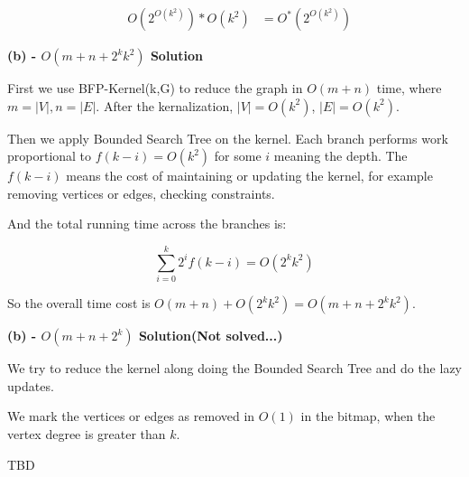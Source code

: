 \documentclass[12pt]{article}
\begin{document}
\begin{equation}
\begin{aligned}
&O(2^{O(k^2)}) * O(k^2)
&=O^*(2^{O(k^2)}) 
\end{aligned}
\end{equation}


\textbf{(b) - $O(m+n+2^k k^2)$ Solution}

First we use BFP-Kernel(k,G) to reduce the graph in $O(m+n)$ time, where $m=|V|, n=|E|$. After the kernalization, $|V|=O(k^2)$, $|E|=O(k^2)$.

Then we apply Bounded Search Tree on the kernel. Each branch performs work proportional to $f(k-i)=O(k^2)$ for some $i$ meaning the depth. The $f(k-i)$ means the cost of maintaining or updating the kernel, for example removing vertices or edges, checking constraints.

And the total running time across the branches is:

\begin{equation}
\sum_{i=0}^{k} 2^i f(k-i) = O(2^k k^2)
\end{equation}

So the overall time cost is $O(m+n)+O(2^k k^2) = O(m+n+2^k k^2)$.

\textbf{(b) - $O(m+n+2^k)$ Solution(Not solved...)}

We try to reduce the kernel along doing the Bounded Search Tree and do the lazy updates.

We mark the vertices or edges as removed in $O(1)$ in the bitmap, when the vertex degree is greater than $k$.

TBD
\end{document}
